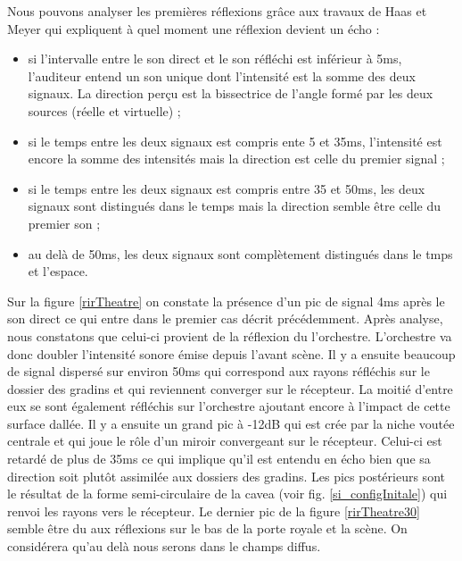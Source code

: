 Nous pouvons analyser les premières réflexions grâce aux travaux de Haas et Meyer \cite[p.49]{haas} qui expliquent à quel moment une réflexion devient un écho :
\begin{itemize}
\item si l'intervalle entre le son direct et le son réfléchi est inférieur à 5ms, l'auditeur entend un son unique dont l'intensité est la somme des deux signaux. La direction perçu est la bissectrice de l'angle formé par les deux sources (réelle et virtuelle) ;
\item si le temps entre les deux signaux est compris ente 5 et 35ms, l'intensité est encore la somme des intensités mais la direction est celle du premier signal ;
\item si le temps entre les deux signaux est compris entre 35 et 50ms, les deux signaux sont distingués dans le temps mais la direction semble être celle du premier son ;
\item au delà de 50ms, les deux signaux sont complètement distingués dans le tmps et l'espace.
\end{itemize}
Sur la figure \ref{rirTheatre} on constate la présence d'un pic de signal 4ms après le son direct ce qui entre dans le premier cas décrit précédemment. Après analyse, nous constatons que celui-ci provient de la réflexion du l'orchestre. L'orchestre va donc doubler l'intensité sonore émise depuis l'avant scène. Il y a ensuite beaucoup de signal dispersé sur environ 50ms qui correspond aux rayons réfléchis sur le dossier des gradins et qui reviennent converger sur le récepteur. La moitié d'entre eux se sont également réfléchis sur l'orchestre ajoutant encore à l'impact de cette surface dallée. Il y a ensuite un grand pic à -12dB qui est crée par la niche voutée centrale et qui joue le rôle d'un miroir convergeant sur le récepteur. Celui-ci est retardé de plus de 35ms ce qui implique qu'il est entendu en écho bien que sa direction soit plutôt assimilée aux dossiers des gradins. Les pics postérieurs sont le résultat de la forme semi-circulaire de la \gls{cavea} (voir fig. \ref{si_configInitale}) qui renvoi les rayons vers le récepteur. Le dernier pic de la figure \ref{rirTheatre30} semble être du aux réflexions sur le bas de la porte royale et la scène. On considérera qu'au delà nous serons dans le champs diffus. 
%
